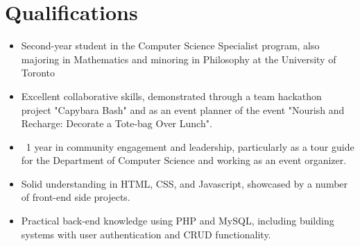 \documentclass[a4paper,10pt]{article} %
\makeatletter
\newenvironment{joblong}[2]
    {
    \begin{tabularx}{\linewidth}{@{}l X r@{}}
    \textbf{#1} & \hfill &  #2 \\[3.75pt]
    \end{tabularx}
    \begin{minipage}[t]{\linewidth}
    \begin{itemize}[nosep,after=\strut, leftmargin=1em, itemsep=3pt,label=--]
    }
    {
    \end{itemize}
    \end{minipage}    
    }
\makeatother
\begin{document}

\section{Qualifications}
\begin{itemize}
    \item Second-year student in the Computer Science Specialist program, also majoring in Mathematics and minoring in Philosophy at the University of Toronto
    \item Excellent collaborative skills, demonstrated through a team hackathon project "Capybara Bash" and as an event planner of the event "Nourish and Recharge: Decorate a Tote-bag Over Lunch".
    \item ~1 year in community engagement and leadership, particularly as a tour guide for the Department of Computer Science and working as an event organizer.
    \item Solid understanding in HTML, CSS, and Javascript, showcased by a number of front-end side projects.
    \item Practical back-end knowledge using PHP and MySQL, including building systems with user authentication and CRUD functionality.
\end{itemize}

\end{document}
